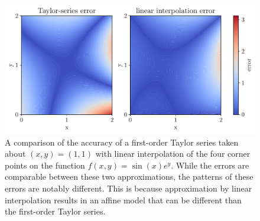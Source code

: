 \begin{figure}
    \centering
    \includegraphics[width=0.9\linewidth]{bundles/interp_fig.pdf}
    \caption{A comparison of the accuracy of a first-order Taylor series taken about $(x,y)=(1,1)$ with linear interpolation of the four corner points on the function $f(x,y) = \sin(x)e^{y}$. While the errors are comparable between these two approximations, the patterns of these errors are notably different. This is because approximation by linear interpolation results in an affine model that can be different than the first-order Taylor series.}
    \label{fig:btb:interp}
\end{figure}





